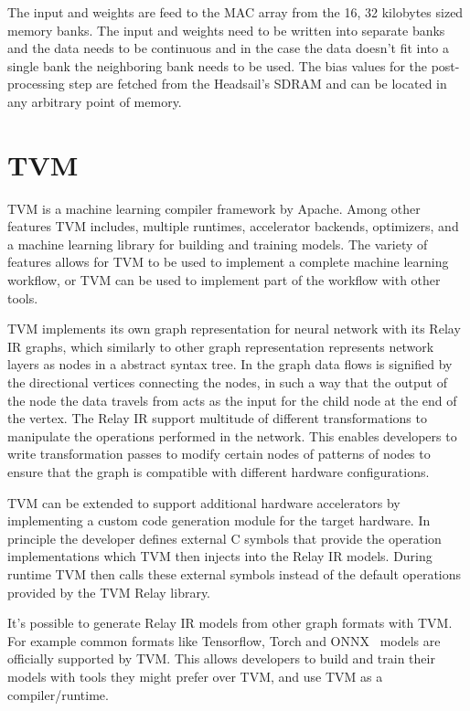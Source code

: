 \documentclass[12pt,a4paper,english
]{tunithesis}
\begin{document}
The input and weights are feed to the MAC array from the 16, 32 kilobytes sized memory banks. The input and weights need to be written into separate banks and the data needs to be continuous and in the case the data doesn't fit into a single bank the neighboring bank needs to be used. The bias values for the post-processing step are fetched from the Headsail's SDRAM and can be located in any arbitrary point of memory.

\section{TVM}
TVM is a machine learning compiler framework by Apache. Among other features TVM includes, multiple runtimes, accelerator backends, optimizers, and a machine learning library for building and training models. The variety of features allows for TVM to be used to implement a complete machine learning workflow, or TVM can be used to implement part of the workflow with other tools.

TVM implements its own graph representation for neural network with its Relay IR graphs, which similarly to other graph representation represents network layers as nodes in a abstract syntax tree.
In the graph data flows is signified by the directional vertices connecting the nodes, in such a way that the output of the node the data travels from acts as the input for the child node at the end of the vertex. The Relay IR support multitude of different transformations to manipulate the operations performed in the network. This enables developers to write transformation passes to modify certain nodes of patterns of nodes to ensure that the graph is compatible with different hardware configurations.

TVM can be extended to support additional hardware accelerators by implementing a custom code generation module for the target hardware. In principle the developer defines external C symbols that provide the operation implementations which TVM then injects into the Relay IR models. During runtime TVM then calls these external symbols instead of the default operations provided by the TVM Relay library.

It's possible to generate Relay IR models from other graph formats with TVM. For example common formats like Tensorflow, Torch and ONNX~\cite{onnxruntime} models are officially supported by TVM. This allows developers to build and train their models with tools they might prefer over TVM, and use TVM as a compiler/runtime.
\end{document}
